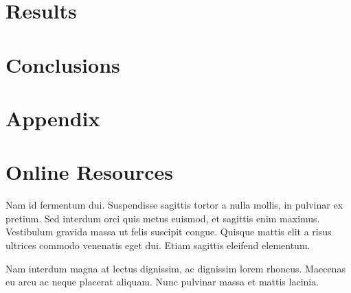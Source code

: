 \documentclass[sigconf]{acmart}
\begin{document}
\section{Results}


\section{Conclusions}

\section{Appendix}




\appendix


\section{Online Resources}

Nam id fermentum dui. Suspendisse sagittis tortor a nulla mollis, in
pulvinar ex pretium. Sed interdum orci quis metus euismod, et sagittis
enim maximus. Vestibulum gravida massa ut felis suscipit
congue. Quisque mattis elit a risus ultrices commodo venenatis eget
dui. Etiam sagittis eleifend elementum.

Nam interdum magna at lectus dignissim, ac dignissim lorem
rhoncus. Maecenas eu arcu ac neque placerat aliquam. Nunc pulvinar
massa et mattis lacinia.
\end{document}
